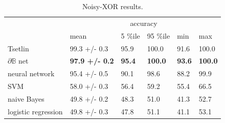 \documentclass{article} %
\begin{document}
\begin{table}[h]
	\centering
	\begin{tabular}{llllll}
		\multicolumn{1}{c}{}                       & \multicolumn{5}{c}{accuracy}                                                                                                                                                            \\
		\multicolumn{1}{l|}{}                      & \multicolumn{1}{l|}{mean}                  & \multicolumn{1}{l|}{5 \%ile}       & \multicolumn{1}{l|}{95 \%ile}       & \multicolumn{1}{l|}{min}           & \multicolumn{1}{l|}{max}            \\ \hline
		\multicolumn{1}{|l|}{Tsetlin}              & \multicolumn{1}{l|}{99.3 +/- 0.3}          & \multicolumn{1}{l|}{95.9}          & \multicolumn{1}{l|}{100.0}          & \multicolumn{1}{l|}{91.6}          & \multicolumn{1}{l|}{100.0}          \\ \hline
		\multicolumn{1}{|l|}{$\partial\mathbb{B}$ net} & \multicolumn{1}{l|}{\textbf{97.9 +/- 0.2}} & \multicolumn{1}{l|}{\textbf{95.4}} & \multicolumn{1}{l|}{\textbf{100.0}} & \multicolumn{1}{l|}{\textbf{93.6}} & \multicolumn{1}{l|}{\textbf{100.0}} \\ \hline
		\multicolumn{1}{|l|}{neural network}       & \multicolumn{1}{l|}{95.4 +/- 0.5}          & \multicolumn{1}{l|}{90.1}          & \multicolumn{1}{l|}{98.6}           & \multicolumn{1}{l|}{88.2}          & \multicolumn{1}{l|}{99.9}           \\ \hline
		\multicolumn{1}{|l|}{SVM}                  & \multicolumn{1}{l|}{58.0 +/- 0.3}          & \multicolumn{1}{l|}{56.4}          & \multicolumn{1}{l|}{59.2}           & \multicolumn{1}{l|}{55.4}          & \multicolumn{1}{l|}{66.5}           \\ \hline
		\multicolumn{1}{|l|}{naive Bayes}          & \multicolumn{1}{l|}{49.8 +/- 0.2}          & \multicolumn{1}{l|}{48.3}          & \multicolumn{1}{l|}{51.0}           & \multicolumn{1}{l|}{41.3}          & \multicolumn{1}{l|}{52.7}           \\ \hline
		\multicolumn{1}{|l|}{logistic regression}  & \multicolumn{1}{l|}{49.8 +/- 0.3}          & \multicolumn{1}{l|}{47.8}          & \multicolumn{1}{l|}{51.1}           & \multicolumn{1}{l|}{41.1}          & \multicolumn{1}{l|}{53.1}           \\ \hline
	\end{tabular}
	\caption{Noisy-XOR results.}
	\label{tab:noisy-xor-results}
\end{table}
\end{document}
